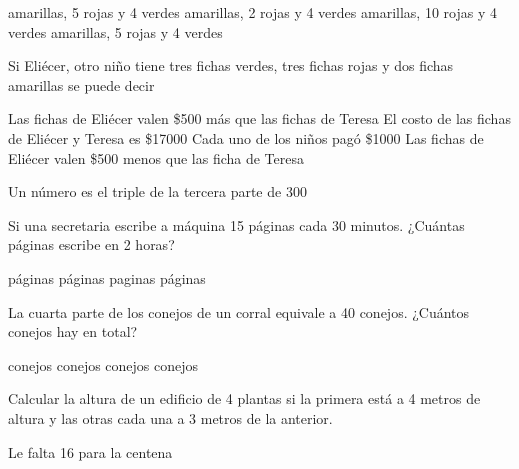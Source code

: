 \documentclass[10pt,letterpaper,addpoints]{exam}
\begin{document}
\begin{questions}
\begin{oneparchoices}
 amarillas, 5 rojas y 4 verdes
 amarillas, 2 rojas y 4 verdes
 amarillas, 10 rojas y 4 verdes
 amarillas, 5 rojas y 4 verdes
\end{oneparchoices}
\question \label{lastquest}
Si Eli\'ecer, otro niño tiene tres fichas verdes, tres fichas rojas y dos fichas amarillas se puede decir
\begin{choices}
\choice Las fichas de Eli\'ecer valen \$500 m\'as que las fichas de Teresa
\CorrectChoice El costo de las fichas de Eli\'ecer y Teresa es \$17000
\choice Cada uno de los niños pag\'o \$1000
\choice Las fichas de Eli\'ecer valen \$500 menos que las ficha de Teresa
\end{choices}
\question Un número es el triple de la tercera parte de 300

\begin{oneparchoices}
\end{oneparchoices}
\question
Si una secretaria escribe a máquina 15 páginas cada 30 minutos. ¿Cuántas páginas escribe en 2 horas?

\begin{oneparchoices}
 páginas
 páginas
 paginas
 páginas
\end{oneparchoices}
\question
La cuarta parte de los conejos de un corral equivale a 40 conejos. ¿Cuántos conejos hay en total?
\begin{oneparchoices}
 conejos
 conejos
 conejos
 conejos
\end{oneparchoices}
\question
Calcular la altura de un edificio de 4 plantas si la primera está a 4 metros de altura y las otras cada una a 3 metros de la anterior.

\begin{oneparchoices}
\end{oneparchoices}
\question
Le falta 16 para la centena

\begin{oneparchoices}
\end{oneparchoices}


\end{questions}
\end{document}
